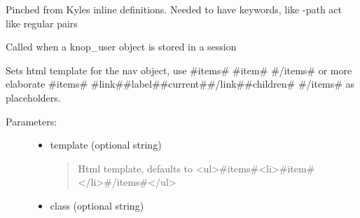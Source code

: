 \documentclass[letterpaper,10pt,english]{sphinxmanual}
\begin{document}
\begin{fulllineitems}

\begin{fulllineitems}
Pinched from Kyles inline definitions. Needed to have keywords, like -path act like regular pairs

\end{fulllineitems}


\begin{fulllineitems}
\label{knop_nav:knop_nav.serializationElements}
Called when a knop\_user object is stored in a session

\end{fulllineitems}


\begin{fulllineitems}
\label{knop_nav:knop_nav.setformat}
\end{fulllineitems}


\begin{fulllineitems}
Sets html template for the nav object, use \#items\# \#item\# \#/items\# or more
elaborate \#items\# \#link\#\#label\#\#current\#\#/link\#\#children\# \#/items\# as
placeholders.
\begin{description}
\item[{Parameters:}] \leavevmode\begin{itemize}
\item {} 
template (optional string)
\begin{quote}

Html template, defaults to \textless{}ul\textgreater{}\#items\#\textless{}li\textgreater{}\#item\#\textless{}/li\textgreater{}\#/items\#\textless{}/ul\textgreater{}
\end{quote}

\item {} 
class (optional string)
\begin{quote}


\end{quote}
\end{itemize}
\end{description}
\end{fulllineitems}
\end{fulllineitems}
\end{document}
